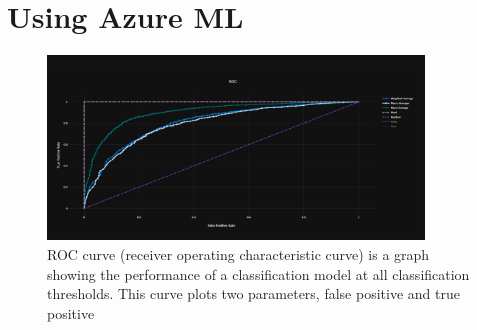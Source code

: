 \section{Using Azure ML}

\begin{figure}[hbt!]
 \includegraphics[width=10cm]{figures/azure_ml_roc.png}
 \caption{ROC curve (receiver operating characteristic curve) is a graph showing the performance of a classification model at all classification thresholds. This curve plots two parameters, false positive and true positive}
\end{figure}

